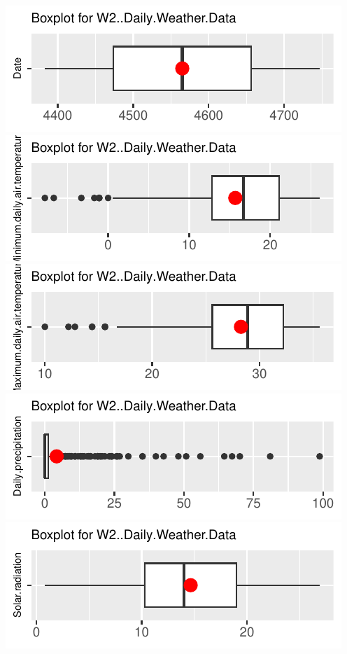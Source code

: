 \documentclass[
]{article}
\begin{document}
\includegraphics{FL_Crop_BMP_QA_single_dataset_files/figure-latex/check-content-of-sheets-61.pdf}
\includegraphics{FL_Crop_BMP_QA_single_dataset_files/figure-latex/check-content-of-sheets-62.pdf}
\includegraphics{FL_Crop_BMP_QA_single_dataset_files/figure-latex/check-content-of-sheets-63.pdf}
\includegraphics{FL_Crop_BMP_QA_single_dataset_files/figure-latex/check-content-of-sheets-64.pdf}
\includegraphics{FL_Crop_BMP_QA_single_dataset_files/figure-latex/check-content-of-sheets-65.pdf}
\end{document}
